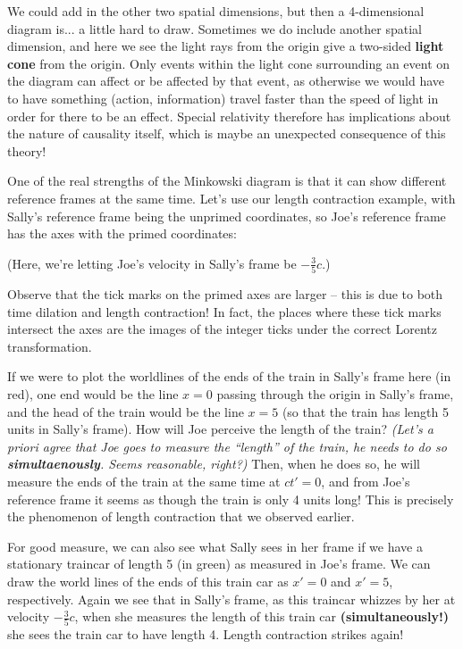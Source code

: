 \documentclass[12pt]{scrartcl}
\newcommand{\incfig}[2]{
    \def\svgscale{#1}
    
}
\begin{document}
We could add in the other two spatial dimensions, but then a 4-dimensional diagram is... a little hard to draw. Sometimes we do include another spatial dimension, and here we see the light rays from the origin give a two-sided \textbf{light cone} from the origin. Only events within the light cone surrounding an event on the diagram can affect or be affected by that event, as otherwise we would have to have something (action, information) travel faster than the speed of light in order for there to be an effect. Special relativity therefore has implications about the nature of causality itself, which is maybe an unexpected consequence of this theory!

One of the real strengths of the Minkowski diagram is that it can show different reference frames at the same time. Let's use our length contraction example, with Sally's reference frame being the unprimed coordinates, so Joe's reference frame has the axes with the primed coordinates:
\begin{center}
	\incfig{2.5}{figures/lorentz-diag}
\end{center}
(Here, we're letting Joe's velocity in Sally's frame be $-\frac 35 c$.)

Observe that the tick marks on the primed axes are larger -- this is due to both time dilation and length contraction! In fact, the places where these tick marks intersect the axes are the images of the integer ticks under the correct Lorentz transformation.

If we were to plot the worldlines of the ends of the train in Sally's frame here (in red), one end would be the line $x = 0$ passing through the origin in Sally's frame, and the head of the train would be the line $x = 5$ (so that the train has length 5 units in Sally's frame). How will Joe perceive the length of the train? \textit{(Let's a priori agree that Joe goes to measure the ``length'' of the train, he needs to do so \textbf{simultaenously}. Seems reasonable, right?)} Then, when he does so, he will measure the ends of the train at the same time at $ct' = 0$, and from Joe's reference frame it seems as though the train is only 4 units long! This is precisely the phenomenon of length contraction that we observed earlier.
\begin{center}
	\incfig{2.5}{figures/train-1}
\end{center}

For good measure, we can also see what Sally sees in her frame if we have a stationary traincar of length 5 (in green) as measured in Joe's frame. We can draw the world lines of the ends of this train car as $x' = 0$ and $x' = 5$, respectively. Again we see that in Sally's frame, as this traincar whizzes by her at velocity $-\frac 35 c$, when she measures the length of this train car \textbf{(simultaneously!)} she sees the train car to have length 4. Length contraction strikes again!
\begin{center}
	\incfig{2.5}{figures/train-2}
\end{center}
\end{document}
